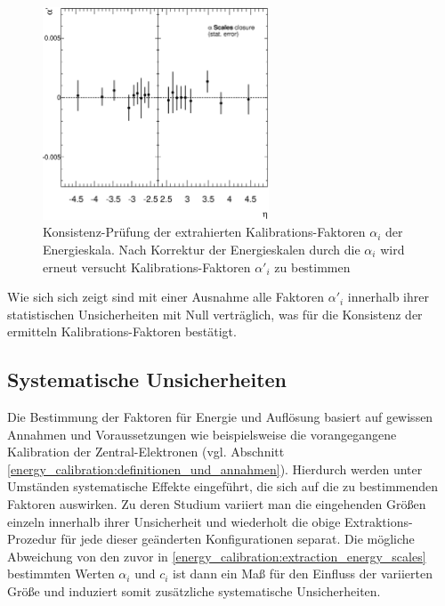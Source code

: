 \begin{figure}
    \centering
    \includegraphics[width=0.6\textwidth]{plots/alpha_2nd}
    \caption[Konsistenz-Prüfung der extrahierten Kalibrations-Faktoren
        $\alpha_i$ der Energieskala]
        {Konsistenz-Prüfung der extrahierten Kalibrations-Faktoren
        $\alpha_i$ der Energieskala. Nach Korrektur der Energieskalen durch die
        $\alpha_i$ wird erneut versucht Kalibrations-Faktoren $\alpha'_i$ zu
        bestimmen}
    \label{fig:alpha_2nd}
\end{figure}

Wie sich sich zeigt sind mit einer Ausnahme alle Faktoren $\alpha'_i$ innerhalb
ihrer statistischen Unsicherheiten mit Null verträglich, was für die Konsistenz
der ermitteln Kalibrations-Faktoren bestätigt.



\subsection{Systematische Unsicherheiten}
\label{energy_calibration:systematics}
Die Bestimmung der Faktoren für Energie und Auflösung basiert auf
gewissen Annahmen und Voraussetzungen wie beispielsweise die vorangegangene
Kalibration der Zentral-Elektronen (vgl. Abschnitt
\ref{energy_calibration:definitionen_und_annahmen}).
Hierdurch werden unter Umständen systematische Effekte eingeführt, die sich auf
die zu bestimmenden Faktoren auswirken. Zu deren Studium variiert man die
eingehenden Größen einzeln innerhalb ihrer Unsicherheit und wiederholt die
obige Extraktions-Prozedur für jede dieser geänderten Konfigurationen separat.
Die mögliche Abweichung von den zuvor in
\ref{energy_calibration:extraction_energy_scales} bestimmten Werten $\alpha_i$
und $c_i$ ist dann ein Maß für den Einfluss der variierten Größe und induziert
somit zusätzliche systematische Unsicherheiten.

